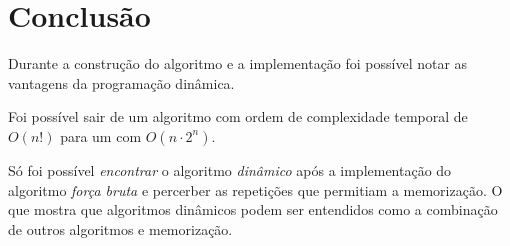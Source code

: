 \documentclass[10pt,a4paper]{article}
\begin{document}
	\section{Conclusão}

	Durante a construção do algoritmo e a implementação foi possível notar as vantagens da programação dinâmica. 

	Foi possível sair de um algoritmo com ordem de complexidade temporal de $O(n!)$ para um com $O(n \cdot 2^n)$. 

	Só foi possível \textit{encontrar} o algoritmo \emph{dinâmico} após a implementação do algoritmo \emph{força bruta} e percerber as repetições que permitiam a memorização. O que mostra que algoritmos dinâmicos podem ser entendidos como a combinação de outros algoritmos e memorização.
\end{document}
